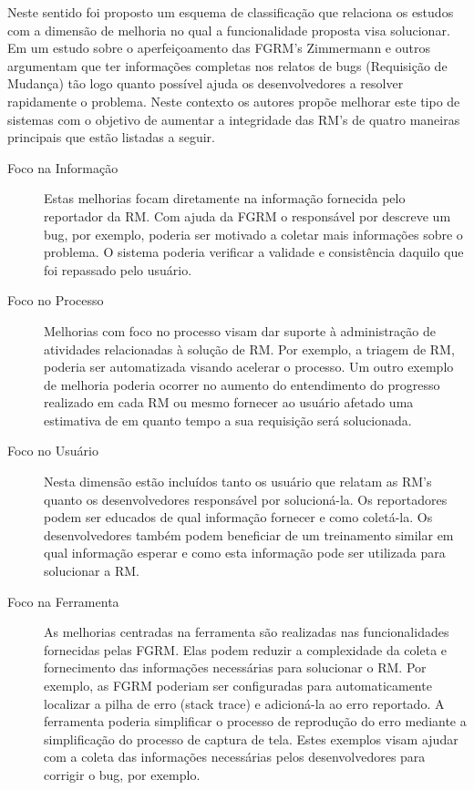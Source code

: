Neste sentido foi proposto um esquema de classificação que relaciona os estudos
com a dimensão de melhoria no qual a funcionalidade proposta visa solucionar. Em
um estudo sobre o aperfeiçoamento das FGRM's Zimmermann e
outros~\cite{zimmermann2009improving} argumentam que ter informações completas
nos relatos de bugs (Requisição de Mudança) tão logo quanto possível ajuda os
desenvolvedores a resolver rapidamente o problema. Neste contexto os autores
propõe melhorar este tipo de sistemas com o objetivo de aumentar a integridade
das RM's de quatro maneiras principais que estão listadas a seguir.

\begin{description}
	\item[Foco na Informação] Estas melhorias focam diretamente na informação
		fornecida pelo reportador da RM\@. Com ajuda da FGRM o responsável por
		descreve um bug, por exemplo, poderia ser motivado a coletar mais
		informações sobre o problema. O sistema poderia verificar a validade e
		consistência daquilo que foi repassado pelo usuário.
   \item[Foco no Processo] Melhorias com foco no processo visam dar suporte à
	   administração de atividades relacionadas à solução de RM\@. Por exemplo,
	   a triagem de RM, poderia ser automatizada visando acelerar o processo. Um
	   outro exemplo de melhoria poderia ocorrer no aumento do entendimento do
	   progresso realizado em cada RM ou mesmo fornecer ao usuário afetado uma
	   estimativa de em quanto tempo a sua requisição será solucionada.
   \item[Foco no Usuário] Nesta dimensão estão incluídos tanto os usuário que
	   relatam as RM's quanto os desenvolvedores responsável por solucioná-la.
	   Os reportadores podem ser educados de qual informação fornecer e como
	   coletá-la. Os desenvolvedores também podem beneficiar de um treinamento
	   similar em qual informação esperar e como esta informação pode ser
	   utilizada para solucionar a RM\@.
	\item[Foco na Ferramenta] As melhorias centradas na ferramenta são
		realizadas nas funcionalidades fornecidas pelas FGRM\@. Elas podem
		reduzir a complexidade da coleta e fornecimento das informações
		necessárias para solucionar o RM\@. Por exemplo, as FGRM poderiam ser
		configuradas para automaticamente localizar a pilha de erro (stack trace) e
		adicioná-la ao erro reportado.  A ferramenta poderia simplificar o
		processo de reprodução do erro mediante a simplificação do processo de
		captura de tela. Estes exemplos visam ajudar com a coleta das
		informações necessárias pelos desenvolvedores para corrigir o bug, por
		exemplo.

\end{description}
